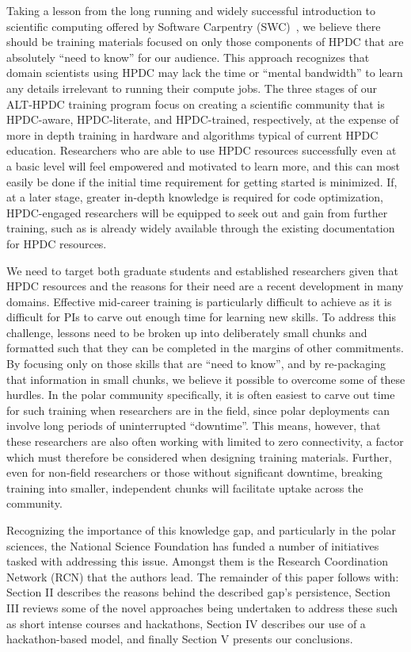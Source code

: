 \documentclass[conference]{IEEEtran}
\begin{document}
Taking a lesson from the long running and widely successful introduction to scientific computing offered by Software Carpentry (SWC)~\cite{Wilson2014-pc}, we believe there should be training materials focused on only those components of HPDC that are absolutely ``need to know'' for our audience. This approach recognizes that domain scientists using HPDC may lack the time or ``mental bandwidth'' to learn any details irrelevant to running their compute jobs. The three stages of our ALT-HPDC training program focus on creating a scientific community that is HPDC-aware, HPDC-literate, and HPDC-trained, respectively, at the expense of more in depth training in hardware and algorithms typical of current HPDC education.  Researchers who are able to use HPDC resources successfully even at a basic level will feel empowered and motivated to learn more, and this can most easily be done if the initial time requirement for getting started is minimized. If, at a later stage, greater in-depth knowledge is required for code optimization, HPDC-engaged researchers will be equipped to seek out and gain from further training, such as is already widely available through the existing documentation for HPDC resources.


We need to target both graduate students and established researchers given that HPDC resources and the reasons for their need are a recent development in many domains. Effective mid-career training is particularly difficult to achieve as it is difficult for PIs to carve out enough time for learning new skills. To address this challenge, lessons need to be broken up into deliberately small chunks and formatted such that they can be completed in the margins of other commitments. By focusing only on those skills that are ``need to know'', and by re-packaging that information in small chunks, we believe it possible to overcome some of these hurdles.  In the polar community specifically, it is often easiest to carve out time for such training when researchers are in the field, since polar deployments can involve long periods of uninterrupted ``downtime''.  This means, however, that these researchers are also often working with limited to zero connectivity, a factor which must therefore be considered when designing training materials. Further, even for non-field researchers or those without significant downtime, breaking training into smaller, independent chunks will facilitate uptake across the community.

Recognizing the importance of this knowledge gap, and particularly in the polar sciences, the National Science Foundation has funded a number of initiatives tasked with addressing this issue.  Amongst them is the Research Coordination Network (RCN) that the authors lead. The remainder of this paper follows with: Section II describes the reasons behind the described gap's persistence, Section III reviews some of the novel approaches being undertaken to address these such as short intense courses and hackathons, Section IV describes our use of a hackathon-based model, and finally Section V presents our conclusions.
\end{document}
